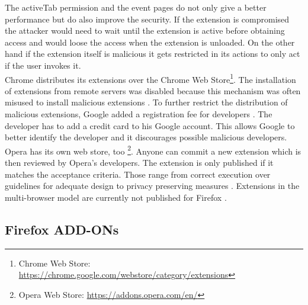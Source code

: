 \documentclass[article,colorback,accentcolor=tud9c,type=bsc]{tudthesis}
\let\stdsubsection\subsection
\renewcommand\subsection{\newpage\stdsubsection}
\begin{document}
	The activeTab permission and the event pages do not only give a better performance but do also improve the security. If the extension is compromised the attacker would need to wait until the extension is active before obtaining access and would loose the access when the extension is unloaded. On the other hand if the extension itself is malicious it gets restricted in its actions to only act if the user invokes it. \\
	
	Chrome distributes its extensions over the Chrome Web Store\footnote{Chrome Web Store: \url{https://chrome.google.com/webstore/category/extensions}}. The installation of extensions from remote servers was disabled because this mechanism was often misused to install malicious extensions \cite{chromeProtectFromMalicious}. To further restrict the distribution of malicious extensions, Google added a registration fee for developers \cite{chromeWebStoreFee}. The developer has to add a credit card to his Google account. This allows Google to better identify the developer and it discourages possible malicious developers. Opera has its own web store, too \footnote{Opera Web Store: \url{https://addons.opera.com/en/}}. Anyone can commit a new extension which is then reviewed by Opera's developers. The extension is only published if it matches the acceptance criteria. Those range from correct execution over guidelines for adequate design to privacy preserving measures \cite{operaSecurityReviewAcceptance}. Extensions in the multi-browser model are currently not published for Firefox \cite{mozillaWebExtensionStatus}.
	
\subsection{Firefox ADD-ONs}
	
\end{document}
